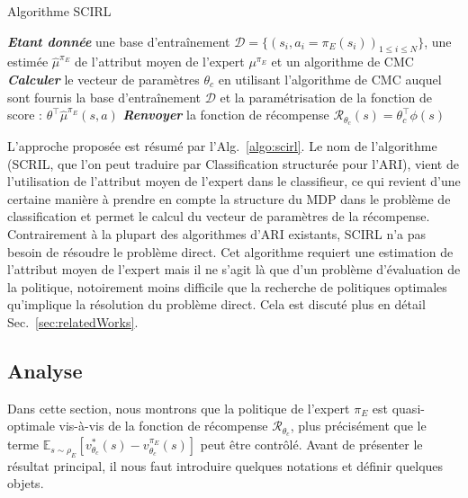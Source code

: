 \documentclass[english,utf8]{./hermes-journal}
\newcommand{\R}{\mathcal{R}}
\newcommand{\D}{\mathcal{D}}
\newcommand{\E}{\mathbb{E}}
\begin{document}
\begin{algorithm2e}%
  \SetAlgoVlined
  \caption{Algorithme SCIRL}
  \label{algo:scirl}
  \BlankLine
  \emph{\textbf{Etant donnée}} une base d'entraînement $\D = \{(s_i,a_i=\pi_E(s_i))_{1\leq i\leq N}\}$,
  une estimée $\hat{\mu}^{\pi_E}$ de l'attribut moyen de l'expert $\mu^{\pi_E}$ et un algorithme de CMC\;
  \BlankLine
  \emph{\textbf{Calculer}} le vecteur de paramètres $\theta_c$ en utilisant l'algorithme de CMC auquel sont fournis la base d'entraînement $\D$ et la paramétrisation de la fonction de score : $\theta^\top\hat{\mu}^{\pi_E}(s,a)$\;
  \BlankLine
  \emph{\textbf{Renvoyer}} la fonction de récompense $\R_{\theta_c}(s) = \theta_c^\top\phi(s)$ \;
\end{algorithm2e}

L'approche proposée est résumé par l'Alg.~\ref{algo:scirl}. Le nom de l'algorithme (SCRIL, que l'on peut traduire par Classification structurée pour l'ARI), vient de l'utilisation de l'attribut moyen de l'expert dans le classifieur, ce qui revient d'une certaine manière à prendre en compte la structure du MDP dans le problème de classification et permet le calcul du vecteur de paramètres de la récompense. Contrairement à la plupart des algorithmes d'ARI existants, SCIRL n'a pas besoin de résoudre le problème direct. Cet algorithme requiert une estimation de l'attribut moyen de l'expert mais il ne s'agit là que d'un problème d'évaluation de la politique, notoirement moins difficile que la recherche de politiques optimales qu'implique la résolution du problème direct. Cela est discuté plus en détail Sec.~\ref{sec:relatedWorks}.
%


\subsection{Analyse}
\label{subsec:scirl:analysis}

Dans cette section, nous montrons que la politique de l'expert $\pi_E$ est quasi-optimale vis-à-vis de la fonction de récompense $\R_{\theta_c}$, plus précisément que le terme
$\E_{s\sim\rho_E}[v^*_{\theta_c}(s)-v^{\pi_E}_{\theta_c}(s)]$ peut être contrôlé.
Avant de présenter le résultat principal, il nous faut introduire quelques notations et définir quelques objets.
\end{document}

